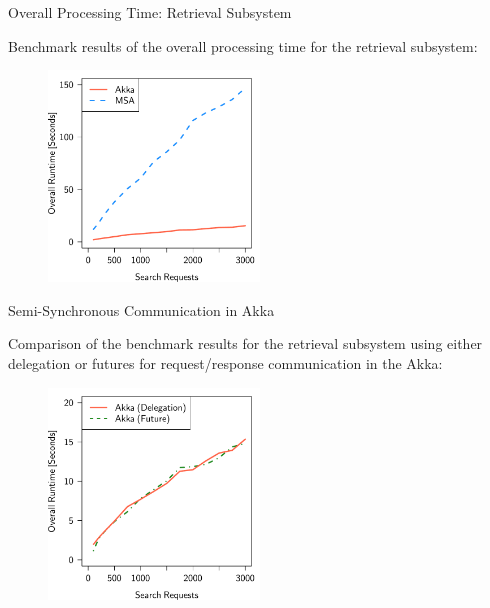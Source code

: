 \documentclass{beamer}
\begin{document}

\begin{frame}{Overall Processing Time: Retrieval Subsystem}

Benchmark results of the overall processing time for the retrieval subsystem:

\begin{center}
  \begin{figure} 
    \includegraphics[width=0.5\textwidth]{graphics/eval-search-rtt-overall.pdf} 
  \end{figure}
\end{center}

\end{frame}


\begin{frame}{Semi-Synchronous Communication in Akka}

Comparison of the benchmark results for the retrieval subsystem using either delegation or futures for request/response communication in the Akka:

\begin{center}
  \begin{figure} 
    \includegraphics[width=0.5\textwidth]{graphics/eval-search-comparison-akka-delegation-future.pdf} 
  \end{figure}
\end{center}

\end{frame}
\end{document}

